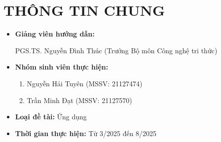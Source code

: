 \documentclass{article}[14pt]
\begin{document}
    \vspace{.5cm}
    
    \Large
    \section{THÔNG TIN CHUNG}
    \begin{itemize}[label = {}]
        
        \item \textbf{Giảng viên hướng dẫn:} 
        \begin{itemize}
            PGS.TS. Nguyễn Đình Thúc (Trưởng Bộ môn Công nghệ tri thức)
        \end{itemize}{}
    
        
        \item \textbf{Nhóm sinh viên thực hiện:}
        
        \begin{enumerate}
            \item Nguyễn Hải Tuyên (MSSV: 21127474) 
            \item Trần Minh Đạt (MSSV: 21127570)
        \end{enumerate}

        \item \textbf{Loại đề tài:} Ứng dụng
        
        \item \textbf{Thời gian thực hiện:} Từ 3/2025 đến 8/2025
        
        
    \end{itemize}
    
    \pagebreak 
    
\end{document}
